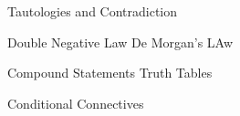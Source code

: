 Tautologies and Contradiction

Double Negative Law
De Morgan's LAw

Compound Statements
Truth Tables

Conditional Connectives